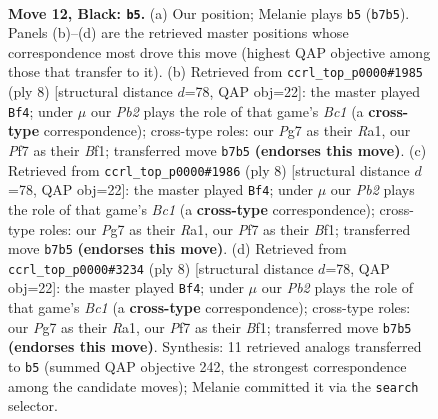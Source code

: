\documentclass[11pt]{article}
\begin{document}
\clearpage

\begin{figure}[p]\centering
\begin{subfigure}{0.46\textwidth}\centering
\resizebox{\linewidth}{!}{%
\newchessgame
\chessboard[
  setfen={r1b1q1k1/pppp1ppp/3n1b2/8/3P4/1P6/P1P2PPP/RNBQ1BK1 b - - 0 12},
  showmover=false,
  pgfstyle=straightmove, color=movearrow, markmove={b7-b5}
]}
\caption{}
\end{subfigure}\hfill
\begin{subfigure}{0.46\textwidth}\centering
\resizebox{\linewidth}{!}{%
\newchessgame
\chessboard[
  setfen={rnbqkbnr/1pp2ppp/p7/3p4/3P4/2N5/PP2PPPP/R1BQKBNR w KQkq - 0 5},
  showmover=false,
  pgfstyle=straightmove, color=movearrow, markmove={c1-f4}
]}
\caption{}
\end{subfigure}
\\[4pt]
\begin{subfigure}{0.46\textwidth}\centering
\resizebox{\linewidth}{!}{%
\newchessgame
\chessboard[
  setfen={rnbqkbnr/1pp2ppp/p7/3p4/3P4/2N5/PP2PPPP/R1BQKBNR w KQkq - 0 5},
  showmover=false,
  pgfstyle=straightmove, color=movearrow, markmove={c1-f4}
]}
\caption{}
\end{subfigure}\hfill
\begin{subfigure}{0.46\textwidth}\centering
\resizebox{\linewidth}{!}{%
\newchessgame
\chessboard[
  setfen={rnbqkbnr/1pp2ppp/p7/3p4/3P4/2N5/PP2PPPP/R1BQKBNR w KQkq - 0 5},
  showmover=false,
  pgfstyle=straightmove, color=movearrow, markmove={c1-f4}
]}
\caption{}
\end{subfigure}
\caption{\textbf{Move 12, Black: \texttt{b5}.} (a) Our position; Melanie plays \texttt{b5} (\texttt{b7b5}). Panels (b)--(d) are the retrieved master positions whose correspondence most drove this move (highest QAP objective among those that transfer to it). (b) Retrieved from \texttt{ccrl\_top\_p0000\#1985} (ply 8) [structural distance $d$=78, QAP obj=22]: the master played \texttt{Bf4}; under $\mu$ our \emph{Pb2} plays the role of that game's \emph{Bc1} (a \textbf{cross-type} correspondence); cross-type roles: our \emph{P}g7 as their \emph{R}a1, our \emph{P}f7 as their \emph{B}f1; transferred move \texttt{b7b5} \textbf{(endorses this move)}. (c) Retrieved from \texttt{ccrl\_top\_p0000\#1986} (ply 8) [structural distance $d$=78, QAP obj=22]: the master played \texttt{Bf4}; under $\mu$ our \emph{Pb2} plays the role of that game's \emph{Bc1} (a \textbf{cross-type} correspondence); cross-type roles: our \emph{P}g7 as their \emph{R}a1, our \emph{P}f7 as their \emph{B}f1; transferred move \texttt{b7b5} \textbf{(endorses this move)}. (d) Retrieved from \texttt{ccrl\_top\_p0000\#3234} (ply 8) [structural distance $d$=78, QAP obj=22]: the master played \texttt{Bf4}; under $\mu$ our \emph{Pb2} plays the role of that game's \emph{Bc1} (a \textbf{cross-type} correspondence); cross-type roles: our \emph{P}g7 as their \emph{R}a1, our \emph{P}f7 as their \emph{B}f1; transferred move \texttt{b7b5} \textbf{(endorses this move)}. Synthesis: 11 retrieved analogs transferred to \texttt{b5} (summed QAP objective 242, the strongest correspondence among the candidate moves); Melanie committed it via the \texttt{search} selector.}
\label{fig:thought-m23}
\end{figure}
\end{document}
